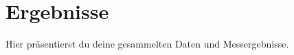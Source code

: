 
\section{Ergebnisse}
\label{chap:ergebnisse}

Hier präsentierst du deine gesammelten Daten und Messergebnisse.